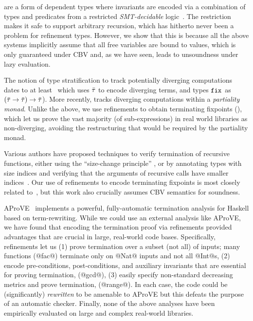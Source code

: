 
 are a form of dependent types where 
invariants are encoded via a combination of types and predicates
from a restricted \emph{SMT-decidable} 
logic~\cite{Rushby98,pfenningxi98,Dunfield07,GordonTOPLAS2011}. 
%
The restriction makes it safe to support arbitrary recursion, 
which has hitherto never been a problem for refinement types.
%
However, we show that this is because all the above systems 
implicitly assume that all free variables are bound to values, 
which is only guaranteed under CBV and, as we have seen, leads 
to unsoundness under lazy evaluation.


The notion of type stratification to track potentially 
diverging computations dates to at least~\citep{ConstableS87} 
which uses $\bar{\mathit{\tau}}$ to encode diverging terms, and types 
$\mathtt{fix}_{}$ as $(\bar{\mathit{\tau}}\rightarrow\bar{\mathit{\tau}}) \rightarrow \bar{\mathit{\tau}}$).
%
More recently, \cite{Capretta05} tracks diverging 
computations within a \emph{partiality monad}.
%
Unlike the above, we use refinements to 
obtain terminating fixpoints (\etfix{}), which let us prove 
the vast majority (of sub-expressions) in real world libraries 
as non-diverging, avoiding the restructuring that would
be required by the partiality monad.

Various authors have proposed techniques to verify termination 
of recursive functions, either using the ``size-change principle'' 
\cite{JonesB04,Sereni05}, or by annotating types with size indices 
and verifying that the arguments of recursive calls have smaller 
indices~\cite{HughesParetoSabry96,BartheTermination}.
%
Our use of refinements to encode terminating fixpoints is most 
closely related to~\cite{XiTerminationLICS01}, but this work 
also crucially assumes CBV semantics for soundness.

AProVE~\cite{Giesl11} implements a powerful, fully-automatic
termination analysis for Haskell based on term-rewriting.
%
While we could use an external analysis like AProVE,
we have found that encoding the termination proof via 
refinements provided advantages that are crucial in 
large, real-world code bases. Specifically, refinements
let us
%
(1) prove termination over a subset 
    (not all) of inputs; many functions (\eg @fac@) 
    terminate only on @Nat@ inputs and not all @Int@s,
%
(2) encode pre-conditions, 
    post-conditions, and auxiliary invariants that 
    are essential for proving termination, (\eg @gcd@),
%
(3) easily specify non-standard 
    decreasing metrics and prove termination, (\eg @range@).
%
In each case, the code could be (significantly) 
\emph{rewritten} to be amenable to AProVE but this defeats
the purpose of an automatic checker.
%
Finally, none of the above analyses have been empirically
evaluated on large and complex real-world libraries.



